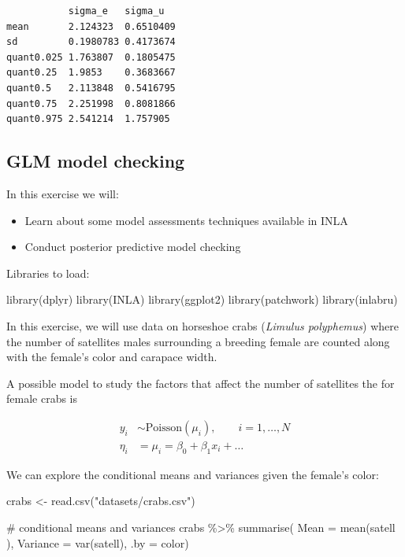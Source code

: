 \documentclass[
  letterpaper,
  DIV=11,
  numbers=noendperiod]{scrartcl}
\newenvironment{Shaded}{\begin{snugshade}}{\end{snugshade}}
\newcommand{\AttributeTok}[1]{\textcolor[rgb]{0.40,0.45,0.13}{#1}}
\newcommand{\CommentTok}[1]{\textcolor[rgb]{0.37,0.37,0.37}{#1}}
\newcommand{\FunctionTok}[1]{\textcolor[rgb]{0.28,0.35,0.67}{#1}}
\newcommand{\NormalTok}[1]{\textcolor[rgb]{0.00,0.23,0.31}{#1}}
\newcommand{\OtherTok}[1]{\textcolor[rgb]{0.00,0.23,0.31}{#1}}
\newcommand{\SpecialCharTok}[1]{\textcolor[rgb]{0.37,0.37,0.37}{#1}}
\newcommand{\StringTok}[1]{\textcolor[rgb]{0.13,0.47,0.30}{#1}}
\providecommand{\tightlist}{%
  \setlength{\itemsep}{0pt}\setlength{\parskip}{0pt}}\usepackage{longtable,booktabs,array}
\begin{document}
\begin{tcolorbox}
\begin{verbatim}
           sigma_e   sigma_u  
mean       2.124323  0.6510409
sd         0.1980783 0.4173674
quant0.025 1.763807  0.1805475
quant0.25  1.9853    0.3683667
quant0.5   2.113848  0.5416795
quant0.75  2.251998  0.8081866
quant0.975 2.541214  1.757905 
\end{verbatim}

\end{tcolorbox}

\subsection{GLM model checking}\label{sec-linmodel}

In this exercise we will:

\begin{itemize}
\tightlist
\item
  Learn about some model assessments techniques available in INLA
\item
  Conduct posterior predictive model checking
\end{itemize}

Libraries to load:

\begin{Shaded}
\begin{Highlighting}[]
\FunctionTok{library}\NormalTok{(dplyr)}
\FunctionTok{library}\NormalTok{(INLA)}
\FunctionTok{library}\NormalTok{(ggplot2)}
\FunctionTok{library}\NormalTok{(patchwork)}
\FunctionTok{library}\NormalTok{(inlabru)     }
\end{Highlighting}
\end{Shaded}

In this exercise, we will use data on horseshoe crabs (\emph{Limulus
polyphemus}) where the number of satellites males surrounding a breeding
female are counted along with the female's color and carapace width.

A possible model to study the factors that affect the number of
satellites the for female crabs is

\[
\begin{aligned}
y_i&\sim\mathrm{Poisson}(\mu_i), \qquad i = 1,\dots,N \\
\eta_i &= \mu_i = \beta_0 + \beta_1 x_i + \ldots
\end{aligned}
\]

We can explore the conditional means and variances given the female's
color:

\begin{Shaded}
\begin{Highlighting}[]
\NormalTok{crabs }\OtherTok{\textless{}{-}} \FunctionTok{read.csv}\NormalTok{(}\StringTok{"datasets/crabs.csv"}\NormalTok{)}

\CommentTok{\# conditional means and variances}
\NormalTok{crabs }\SpecialCharTok{\%\textgreater{}\%}
  \FunctionTok{summarise}\NormalTok{( }\AttributeTok{Mean =} \FunctionTok{mean}\NormalTok{(satell ),}
             \AttributeTok{Variance =} \FunctionTok{var}\NormalTok{(satell),}
                     \AttributeTok{.by =}\NormalTok{ color)}
\end{Highlighting}
\end{Shaded}
\end{document}
